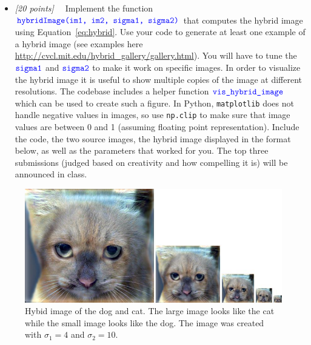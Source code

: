 \documentclass[10pt,letterpaper]{article}
\newcommand{\cmd}[1] {{\color{blue}\texttt{#1}}}
\newcommand{\points}[1]{{\color{mygreen}\emph{[#1]\ \ }}}
\begin{document}
\begin{itemize}

\item \points{20 points} Implement the function 
$\cmd{hybridImage(im1, im2, sigma1, sigma2)}$ that computes the hybrid
  image using Equation~\ref{eq:hybrid}. Use your code to generate at
  least one example of a hybrid image (see examples here
  \url{http://cvcl.mit.edu/hybrid_gallery/gallery.html}). You will
  have to tune the $\cmd{sigma1}$ and $\cmd{sigma2}$ to make it work
  on specific images. In order to visualize the hybrid image it is
  useful to show multiple copies of the image at different
  resolutions.
The codebase includes a helper function $\cmd{vis\_hybrid\_image}$ which can be used to create such a figure.
In Python, \cmd{matplotlib} does not handle negative values in images,
so use \cmd{np.clip} to make sure that image values are
between 0 and 1 (assuming floating point representation).
Include the code, the two source images, the hybrid image displayed in
the format below, as well as the parameters that worked for you. The
top three submissions (judged based on creativity and how compelling it is) will be announced in class.

\end{itemize}
\begin{figure}[h]
\includegraphics[width=\linewidth]{fig/hybrid-4-10.jpg}
\caption{Hybid image of the dog and cat. The large image looks like
  the cat while the small image looks like the dog. The image was
  created with $\sigma_1 = 4$ and $\sigma_2 = 10$.}
\end{figure}
\end{document}

